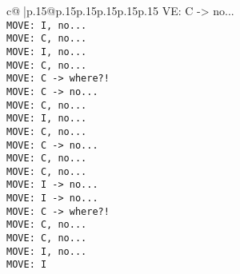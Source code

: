 \documentclass{article}
\begin{document}
{\begin{supertabular}{c@{$\;$}|p{.15\linewidth}@{}p{.15\linewidth}p{.15\linewidth}p{.15\linewidth}p{.15\linewidth}p{.15\linewidth}}
{{{VE: C -> no...\\ \tt  MOVE: I, no...\\ \tt  MOVE: C, no...\\ \tt  MOVE: I, no...\\ \tt  MOVE: C, no...\\ \tt  MOVE: C -> where?!\\ \tt  MOVE: C -> no...\\ \tt  MOVE: C, no...\\ \tt  MOVE: I, no...\\ \tt  MOVE: C, no...\\ \tt  MOVE: C -> no...\\ \tt  MOVE: C, no...\\ \tt  MOVE: C, no...\\ \tt  MOVE: I -> no...\\ \tt  MOVE: I -> no...\\ \tt  MOVE: C -> where?!\\ \tt  MOVE: C, no...\\ \tt  MOVE: C, no...\\ \tt  MOVE: I, no...\\ \tt  MOVE: I}}}
\end{supertabular}}
\end{document}
